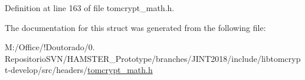Definition at line 163 of file tomcrypt\+\_\+math.\+h.



The documentation for this struct was generated from the following file\+:\begin{DoxyCompactItemize}
\item 
M\+:/\+Office/!\+Doutorado/0. Repositorio\+S\+V\+N/\+H\+A\+M\+S\+T\+E\+R\+\_\+\+Prototype/branches/\+J\+I\+N\+T2018/include/libtomcrypt-\/develop/src/headers/\mbox{\hyperlink{tomcrypt__math_8h}{tomcrypt\+\_\+math.\+h}}\end{DoxyCompactItemize}
